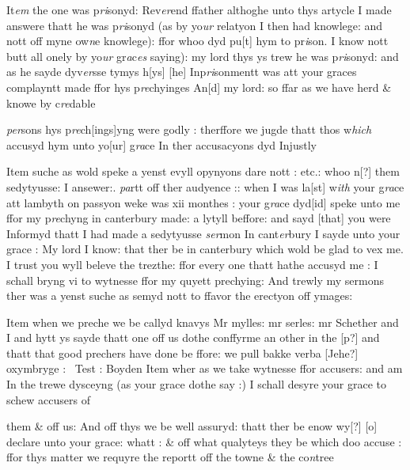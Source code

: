 \documentclass[12pt, a4paper]{book}
\begin{document}
	
		\ifthenelse{\isodd{\thepage}}
		{\reversemarginpar}
		{\normalmarginpar}
		It\textit{em} the one was p\textit{ri}sonyd: Rev\textit{er}end ffather althoghe unto thys artycle
I made answere thatt he was p\textit{ri}sonyd (as by yo\textit{ur} relatyon I then
 	had knowlege: and nott off myne ow\textit{n}e knowlege): ffor whoo dyd pu[t]
hym to pr\textit{i}son. I know nott butt all onely by yo\textit{ur} gr\textit{a}c\textit{es }saying): my
 	lord thys ys trew he was p\textit{ri}sonyd: and as he sayde dyv\textit{er}sse tymys h[ys]
 	[he]
 	Inp\textit{ri}sonmentt was att your graces complayntt made ffor hys p\textit{re}chyinges An[d]
my lord: so ffar as we have herd \& knowe by c\textit{re}dable \textit{}
                              
                              	\textit{per}sons
			 hys p\textit{re}ch[ings]yng
 	were godly : therffore we jugde thatt thos w\textit{hich} accusyd hym unto yo[ur]
g\textit{ra}ce In ther accusacyons dyd Injustly


		\ifthenelse{\isodd{\thepage}}
		{\reversemarginpar}
		{\normalmarginpar}
		Item suche as wold speke a yenst evyll opynyons dare nott : etc.: whoo n[?]
 	them sedytyusse: I ansewer:. \textit{pa}rtt off ther audyence :: when I was la[st]
 	w\textit{ith} your g\textit{ra}ce att lambyth on passyon weke was xii monthes : your g\textit{ra}ce dyd[id]
	speke unto me ffor my p\textit{re}chyng in canterbury made: a lytyll beffore: and sayd [that]
you were Informyd thatt I had made a sedytyusse \textit{ser}mon In cant\textit{er}bury
 	I sayde unto your grace : My lord I know: that ther be in canterbury which wold
be glad to vex me. I trust you wyll beleve the trezthe: ffor every
one thatt hathe accusyd me : I schall bryng vi to wytnesse ffor my 
quyett prechying: And trewly my sermons ther was a yenst suche as semyd
nott to ffavor the erectyon off ymages: 

		\ifthenelse{\isodd{\thepage}}
		{\reversemarginpar}
		{\normalmarginpar}
		Item when we preche we be callyd knavys Mr mylles: mr serles: mr Schether
and I and hytt ys sayde thatt one off us dothe conffyrme an other in the [p?]
and thatt that good prechers have done be ffore: we pull bakke verba [Jehe?]
 	oxymbryge :  Test : Boyden
Item wher as we take wytnesse ffor accusers: and am In the trewe dysceyng
(as your grace dothe say :) I schall desyre your grace to schew accusers of

		\ifthenelse{\isodd{\thepage}}
		{\reversemarginpar}
		{\normalmarginpar}
		them \& off us: And off thys we be well assuryd: thatt ther
			 be enow wy[?]
	[o]
 	declare unto your grace: whatt : \& off what qualyteys they be which doo accuse
			 : ffor thys
matter 
			we requyre the reportt off the towne \& the co\textit{n}tree
\end{document}
